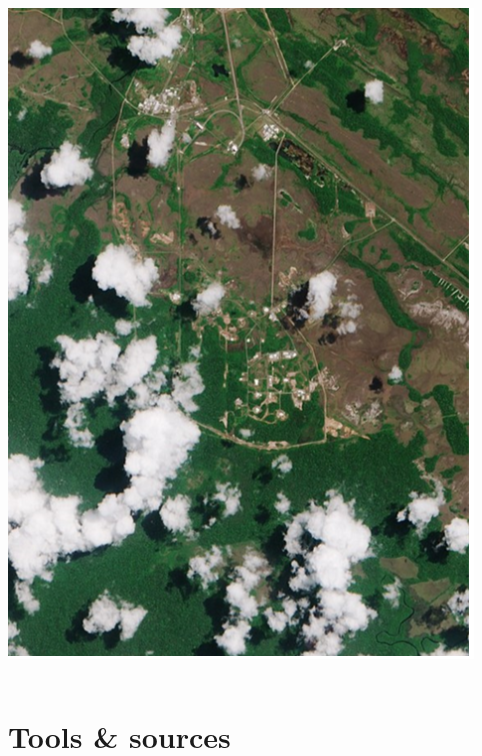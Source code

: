 \documentclass[xcolor=x11names,aspectratio=169, compress]{beamer}
\renewcommand{\(}{\begin{columns}}
\renewcommand{\)}{\end{columns}}
\newcommand{\<}[1]{\begin{column}{#1}}
\renewcommand{\>}{\end{column}}
\begin{document}
\begin{frame}
\begin{columns}[T]
\begin{column}{0.3\textwidth}
            \includegraphics[width=\textwidth]{Clouds.PNG}
        \end{column}
    \end{columns}
\end{frame}

\section{Tools \& sources}
\end{document}
